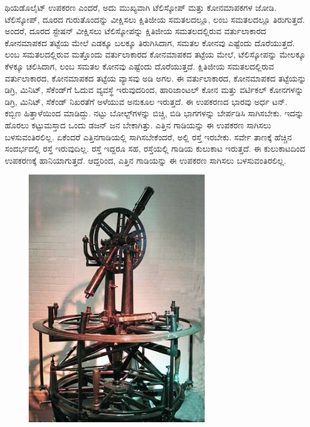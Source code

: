 ಥಿಯಡೊಲೈಟ್​ ಉಪಕರಣ ಎಂದರೆ, ಅದು ಮುಖ್ಯವಾಗಿ ಟೆಲಿಸ್ಕೋಪ್​ ಮತ್ತು ಕೋನಮಾಪಕಗಳ ಜೋಡಿ. ಟೆಲಿಸ್ಕೋಪ್​, ದೂರದ ಗುರುತೊಂದನ್ನು ವೀಕ್ಷಿಸಲು ಕ್ಷಿತಿಜೀಯ ಸಮತಲದಲ್ಲೂ, ಲಂಬ ಸಮತಲದಲ್ಲೂ ತಿರುಗುತ್ತದೆ. ಅಂದರೆ, ದೂರದ ಸ್ಟೇಷನ್​ ವೀಕ್ಷಿಸಲು ಟೆಲಿಸ್ಕೋಪನ್ನು ಕ್ಷಿತಿಜೀಯ ಸಮತಲದಲ್ಲಿರುವ ವರ್ತುಲಾಕಾರದ ಕೋನಮಾಪಕದ ತಟ್ಟೆಯ ಮೇಲೆ ಎಡಕ್ಕೂ ಬಲಕ್ಕೂ ತಿರುಗಿಸಿದಾಗ, ಸಮತಲ ಕೋನವು ಎಷ್ಟೆಂದು ದೊರೆಯುತ್ತದೆ. ಲಂಬ ಸಮತಲದಲ್ಲಿರುವ ಮತ್ತೊಂದು ವರ್ತುಲಾಕಾರದ ಕೋನಮಾಪಕದ ತಟ್ಟೆಯ ಮೇಲೆ, ಟೆಲಿಸ್ಕೋಪನ್ನು ಮೇಲಕ್ಕೂ ಕೆಳಕ್ಕೂ ಚಲಿಸಿದಾಗ, ಲಂಬ ಸಮತಲ ಕೋನವು ಎಷ್ಟೆಂದು ದೊರೆಯುತ್ತದೆ. ಕ್ಷಿತಿಜೀಯ ಸಮತಲದಲ್ಲಿರುವ ವರ್ತುಲಾಕಾರದ, ಕೋನಮಾಪಕದ ತಟ್ಟೆಯ ವ್ಯಾಸವು  ಅಡಿ ಅಗಲ. ಈ ವರ್ತುಲಾಕಾರದ, ಕೋನಮಾಪಕದ ತಟ್ಟೆಯನ್ನು ಡಿಗ್ರಿ, ಮಿನಿಟ್​, ಸೆಕೆಂಡ್​ಗೆ ಓದುವ ವ್ಯವಸ್ಥೆ ಇರುವುದರಿಂದ, ಹಾರಿಜಾಂಟಲ್​ ಕೋನ ಮತ್ತು ವರ್ಟಿಕಲ್​ ಕೋನಗಳನ್ನು ಡಿಗ್ರಿ, ಮಿನಿಟ್​, ಸೆಕೆಂಡ್​ ನಿಖರತೆಗೆ ಅಳೆಯುವ ಅನುಕೂಲ ಇರುತ್ತದೆ. ಈ ಉಪಕರಣದ ಭಾರವು ಅರ್ಧ ಟನ್​. ಕಬ್ಬಿಣ ಹಿತ್ತಾಳೆಯಿಂದ ಮಾಡಿದ್ದು. ನಟ್ಟು ಬೋಲ್ಟ್​ಗಳನ್ನು ಬಿಚ್ಚಿ, ಬಿಡಿ ಭಾಗಗಳನ್ನು ಬೇರ್ಪಡಿಸಿ ಸಾಗಿಸಬೇಕು. ಇದನ್ನು ಹೊರಲು ಕಟ್ಟುಮಸ್ತಾದ ಒಂದು ಡಜನ್​ ಜನ ಬೇಕಾಗಿತ್ತು. ಎತ್ತಿನ ಗಾಡಿಯನ್ನು ಈ ಉಪಕರಣ ಸಾಗಿಸಲು ಬಳಸುವಂತಿರಲಿಲ್ಲ. ಏಕೆಂದರೆ ಎತ್ತಿನಗಾಡಿಯಲ್ಲಿ ಸಾಗಿಸಬೇಕೆಂದರೆ, ಅಲ್ಲಿ ರಸ್ತೆ ಇರಬೇಕು. ಸರ್ವೇ ತಾಣಕ್ಕೆ ಹೆಚ್ಚಿನ ಸಂದರ್ಭದಲ್ಲಿ ರಸ್ತೆ ಇರುವುದಿಲ್ಲ. ರಸ್ತೆ ಇದ್ದರೂ ಸಹ, ರಸ್ತೆಯಲ್ಲಿ ಗಾಡಿಯ ಕುಲುಕಾಟ ಇರುತ್ತದೆ. ಈ ಕುಲುಕಾಟದಿಂದ ಉಪಕರಣಕ್ಕೆ ಹಾನಿಯಾಗುತ್ತದೆ.
 ಆದ್ದರಿಂದ, ಎತ್ತಿನ ಗಾಡಿಯನ್ನು ಈ ಉಪಕರಣ ಸಾಗಿಸಲು ಬಳಸುವಂತಿರಲಿಲ್ಲ.

\begin{figure}
\includegraphics[scale=0.6]{"images/image007.jpg"}
\end{figure}

